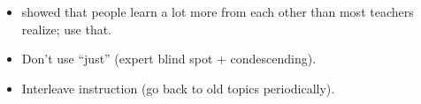 \documentclass[10pt,letterpaper]{article}
\begin{document}
\begin{itemize}

\item \cite{Nuth2007} showed that people learn a lot more from each other
  than most teachers realize; use that.

\item Don't use ``just'' (expert blind spot + condescending).

\item Interleave instruction (go back to old topics periodically).

\end{itemize}

\cite{Ambr2010}
\cite{Hust2012}
\cite{Lang2016}
\cite{Majo2015}
\cite{Maye2003}
\cite{Maye2009}
\cite{Mill1956}
\cite{Nuth2007}
\cite{Rice2018}
\cite{Wein2018a}
\cite{Wein2018b}
\cite{Wlod2017}


\end{document}
